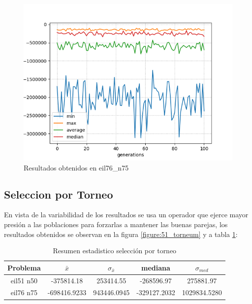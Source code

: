 \documentclass[twocolumn]{IEEEtran}
\begin{document}
\begin{figure}[htbp!]
    \centering
    \includegraphics[width=\linewidth]{figures/ttp_eil76_random.png}
    \caption{Resultados obtenidos en eil76\_n75}
    \label{figure:76_random}
\end{figure}

\subsection{Seleccion por Torneo}
En vista de la variabilidad de los resultados se usa un operador que  ejerce mayor presión
a las poblaciones para forzarlas a mantener las buenas parejas, los resultados obtenidos se 
observan en la figura \ref{figure:51_torneum} y a tabla \ref{table:results_t}:

\begin{table}[htpb]
    \centering
    \begin{tabular}{|c|c|c|c|c|}
        \hline
        Problema & $\bar{x}$ & $\sigma_{\bar{x}}$ & mediana & $\sigma_{med}$ \\
        \hline
        eil51 n50 & -375814.18 & 253414.55 & -268596.97 & 275881.97 \\
        \hline
        eil76 n75 & -698416.9233 & 943446.0945 & -329127.2032 & 1029834.5280 \\
        \hline
    \end{tabular}
    \caption{Resumen estadistico selección por torneo}
    \label{table:results_t}
\end{table}
\end{document}
